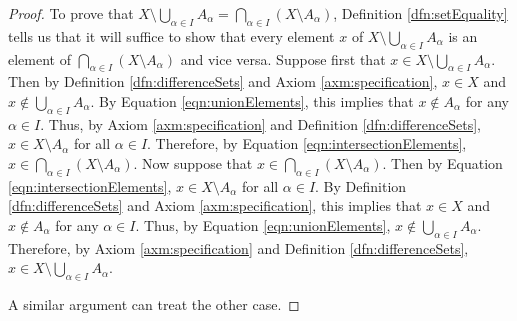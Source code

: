 \documentclass[../main.tex]{subfiles}
\begin{document}
\begin{enumerate}[ref={\thesection.\arabic*}]
\begin{proof}
        To prove that $X\setminus\bigcup_{\alpha\in I}A_\alpha=\bigcap_{\alpha\in I}(X\setminus A_\alpha)$, Definition \ref{dfn:setEquality} tells us that it will suffice to show that every element $x$ of $X\setminus\bigcup_{\alpha\in I}A_\alpha$ is an element of $\bigcap_{\alpha\in I}(X\setminus A_\alpha)$ and vice versa. Suppose first that $x\in X\setminus\bigcup_{\alpha\in I}A_\alpha$. Then by Definition \ref{dfn:differenceSets} and Axiom \ref{axm:specification}, $x\in X$ and $x\notin\bigcup_{\alpha\in I}A_\alpha$. By Equation \ref{eqn:unionElements}, this implies that $x\notin A_\alpha$ for any $\alpha\in I$. Thus, by Axiom \ref{axm:specification} and Definition \ref{dfn:differenceSets}, $x\in X\setminus A_\alpha$ for all $\alpha\in I$. Therefore, by Equation \ref{eqn:intersectionElements}, $x\in\bigcap_{\alpha\in I}(X\setminus A_\alpha)$. Now suppose that $x\in\bigcap_{\alpha\in I}(X\setminus A_\alpha)$. Then by Equation \ref{eqn:intersectionElements}, $x\in X\setminus A_\alpha$ for all $\alpha\in I$. By Definition \ref{dfn:differenceSets} and Axiom \ref{axm:specification}, this implies that $x\in X$ and $x\notin A_\alpha$ for any $\alpha\in I$. Thus, by Equation \ref{eqn:unionElements}, $x\notin\bigcup_{\alpha\in I}A_\alpha$. Therefore, by Axiom \ref{axm:specification} and Definition \ref{dfn:differenceSets}, $x\in X\setminus\bigcup_{\alpha\in I}A_\alpha$.\par
        A similar argument can treat the other case.
    \end{proof}
\end{enumerate}
\end{document}
